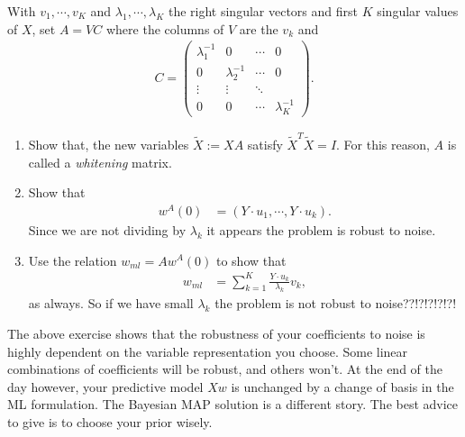 \begin{exercise}
  With $v_1,\cdots,v_K$ and $\lambda_1,\cdots,\lambda_K$ the right singular vectors and first $K$ singular values of $X$, set $A = VC$ where the columns of $V$ are the $v_k$ and
  \begin{align*}
    C = \left( 
    \begin{matrix}
      \lambda_1^{-1} & 0 & \cdots & 0\\
      0 &\lambda_2^{-1} & \cdots & 0\\
      \vdots & \vdots & \ddots \\
      0 & 0 & \cdots & \lambda_K^{-1}
    \end{matrix}
    \right).
  \end{align*}
  \begin{enumerate}
    \item Show that, the new variables $\tilde X := XA$ satisfy $\tilde X^T\tilde X = I$.  For this reason, $A$ is called a \emph{whitening} matrix.
    \item Show that 
      \begin{align*}
        w^A(0) &= (Y\cdot u_1,\cdots,Y\cdot u_k).
      \end{align*}
      Since we are not dividing by $\lambda_k$ it appears the problem is robust to noise.
    \item Use the relation $w_{ml} = Aw^A(0)$ to show that
      \begin{align*}
        w_{ml} &= \sum_{k=1}^K \frac{Y\cdot u_k}{\lambda_k}v_k,
      \end{align*}
      as always.  So if we have small $\lambda_k$ the problem is not robust to noise??!?!?!?!?!  
  \end{enumerate}
\end{exercise}
  The above exercise shows that the robustness of your coefficients to noise is highly dependent on the variable representation you choose.  Some linear combinations of coefficients will be robust, and others won't.  At the end of the day however, your predictive model $Xw$ is unchanged by a change of basis in the ML formulation.  The Bayesian MAP solution is a different story.  The best advice to give is to choose your prior wisely.

